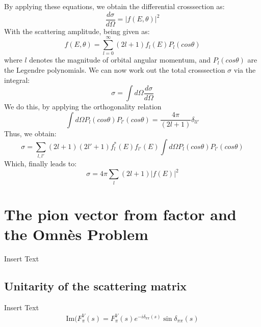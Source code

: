 \documentclass[a4paper]{article}
\begin{document}
By applying these equations, we obtain the differential crosssection as:
\begin{equation}
    \frac{d\sigma}{d\Omega}=|f(E,\theta)|^2
\end{equation}
With the scattering amplitude, being given as:
\begin{equation}
    f(E,\theta)=\sum_{l=0}^\infty(2l+1)f_l(E)P_l(cos\theta)
\end{equation}
where $l$ denotes the magnitude of orbital angular momentum, and
$P_l(cos\theta)$ are the Legendre polynomials.
We can now work out the total crosssection $\sigma$ via the integral:
\begin{equation}
    \sigma=\int{d\Omega\frac{d\sigma}{d\Omega}}
\end{equation}
We do this, by applying the orthogonality relation
\begin{equation}
    \int{d\Omega P_l(cos\theta)P_{l'}(cos\theta)}=\frac{4\pi}{(2l+1)}\delta_{ll'}
\end{equation}
Thus, we obtain:
\begin{equation}
    \sigma=\sum_{l,l'}(2l+1)(2l'+1)f^*_l(E)f_{l'}(E)\int{d\Omega P_l(cos\theta)P_{l'}(cos\theta)}
\end{equation}
Which, finally leads to:
\begin{equation}
    \sigma=4\pi\sum_l(2l+1)|f(E)|^2
\end{equation}



\section{The pion vector from factor and the Omn\`es Problem}
Insert Text
\subsection{Unitarity of the scattering matrix}
Insert Text
\begin{align}
    \label{eq:rec}
    \text{Im}(F^V_\pi(s) = F^V_\pi(s) e^{-i\delta_{\pi\pi}(s)}\sin\delta_{\pi\pi}(s)
\end{align}
\end{document}
